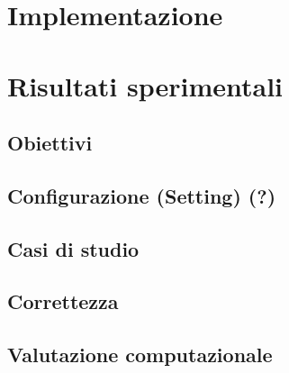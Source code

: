 \documentclass[Lau,binding=0.6cm]{sapthesis}
\begin{document}

\chapter{Implementazione}



\chapter{Risultati sperimentali}

\section{Obiettivi}

\section{Configurazione (Setting) (?)}

\section{Casi di studio}

\section{Correttezza}

\section{Valutazione computazionale}
\end{document}
